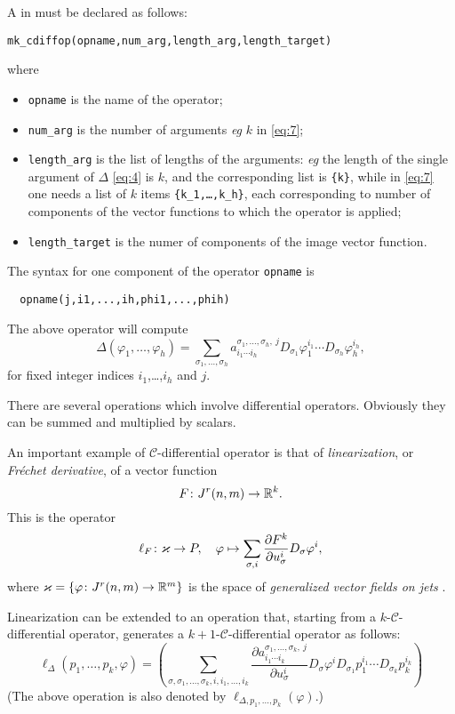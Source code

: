 A \cdiffop in \cde must be declared as follows:
\begin{verbatim}
mk_cdiffop(opname,num_arg,length_arg,length_target)
\end{verbatim}
where
\begin{itemize}
\item \texttt{opname} is the name of the operator;
\item \texttt{num\_arg} is the number of arguments \emph{eg} $k$ in
  \eqref{eq:7};
\item \texttt{length\_arg} is the list of lengths of the arguments: \emph{eg}
  the length of the single argument of $\Delta$ \eqref{eq:4} is $k$, and the
  corresponding list is \texttt{\{k\}}, while in \eqref{eq:7} one needs a list
  of $k$ items \texttt{\{k\_1,\dots,k\_h\}}, each corresponding to number of
  components of the vector functions to which the operator is applied;
\item \texttt{length\_target} is the numer of components of the image vector
  function.
\end{itemize}
The syntax for one component of the operator \texttt{opname} is
\begin{verbatim}
  opname(j,i1,...,ih,phi1,...,phih)
\end{verbatim}
The above operator will compute
\begin{equation}
  \label{eq:10}
  \Delta(\varphi_1,\dots,\varphi_h) = \sum_{\sigma_1,\ldots,\sigma_h}
  a^{\sigma_1,\ldots,\sigma_h,\ j}_{i_1\cdots i_h}
  D_{\sigma_1} \varphi_1^{i_1}\cdots D_{\sigma_h}\varphi_h^{i_h},
\end{equation}
for fixed integer indices $i_1$,\dots,$i_h$ and $j$.

\medskip

There are several operations which involve differential operators. Obviously
they can be summed and multiplied by scalars.

An important example of $\mathcal{C}$-differential operator is that of
\emph{linearization}, or \emph{Fr\'echet derivative}, of a vector function
\[
    F\colon J^r(n,m) \to \mathbb{R}^k.
\]
This is the operator
\[
  \ell_F\colon \varkappa \to P ,\quad \varphi \mapsto
  \sum_{\sigma, i}\pd{F^k}{u^i_\sigma}D_\sigma\varphi^i,
\]
where $\varkappa = \{ \varphi \colon J^r(n,m) \to \mathbb{R}^m \}$ is the space of
\emph{generalized vector fields on jets} \cite{Krasilshchik:99,Olver:93}.

Linearization can be extended to an operation that, starting from a
$k$-$\mathcal{C}$-differential operator, generates a
$k+1$-$\mathcal{C}$-differential operator as follows:
\[
  \ell_{\Delta}(p_1,\dots,p_k,\varphi) =
  (\sum_{\sigma,\sigma_1,\ldots,\sigma_k, i,i_1,\ldots,i_k}
  \frac{\partial a^{\sigma_1,\ldots,\sigma_k,\ j}_{i_1\cdots i_k}}{\partial
    u^i_\sigma}
  D_{\sigma}\varphi^i D_{\sigma_1}p_1^{i_1}\cdots D_{\sigma_k}p_k^{i_k})
\]
(The above operation is also denoted by $\ell_{\Delta,p_1,\dots,p_k}(\varphi)$.)

